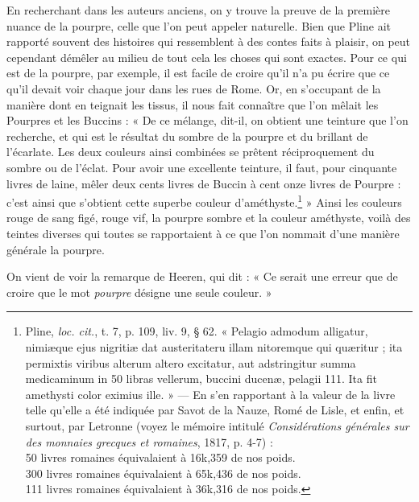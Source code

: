 \documentclass[a4paper, 11pt, oneside, polutonikogreek, french]{article}
\begin{document}
En recherchant dans les auteurs anciens, on y trouve la preuve de la première nuance de la pourpre, celle que l'on peut appeler naturelle. Bien que Pline ait rapporté souvent des histoires qui ressemblent à des contes faits à plaisir, on peut cependant démêler au milieu de tout cela les choses qui sont exactes. Pour ce qui est de la pourpre, par exemple, il est facile de croire qu'il n'a pu écrire que ce qu'il devait voir chaque jour dans les rues de Rome. Or, en s'occupant de la manière dont en teignait les tissus, il nous fait connaître que l'on mêlait les Pourpres et les Buccins : « De ce mélange, dit-il, on obtient une teinture que l'on recherche, et qui est le résultat du sombre de la pourpre et du brillant de l'écarlate. Les deux couleurs ainsi combinées se prêtent réciproquement du sombre ou de l'éclat. Pour avoir une excellente teinture, il faut, pour cinquante livres de laine, mêler deux cents livres de Buccin à cent onze livres de Pourpre : c'est ainsi que s'obtient cette superbe couleur d'améthyste.\footnote{Pline, \emph{loc. cit.}, t. 7, p. 109, liv. 9, § 62. « Pelagio admodum alligatur, nimiæque ejus nigritiæ dat austeritateru illam nitoremque qui quæritur ; ita permixtis viribus alterum altero excitatur, aut adstringitur summa medicaminum in 50 libras vellerum, buccini ducenæ, pelagii 111. Ita fit amethysti color eximius ille. » --- En s'en rapportant à la valeur de la livre telle qu'elle a été indiquée par Savot de la Nauze, Romé de Lisle, et enfin, et surtout, par Letronne (voyez le mémoire intitulé \emph{Considérations générales sur des monnaies grecques et romaines}, 1817, p. 4-7) :\\\hspace*{5mm}50 livres romaines équivalaient à 16k,359 de nos poids.\\\hspace*{5mm}300 livres romaines équivalaient à 65k,436 de nos poids.\\\hspace*{5mm}111 livres romaines équivalaient à 36k,316 de nos poids.} » Ainsi les couleurs rouge de sang figé, rouge vif, la pourpre sombre et la couleur améthyste, voilà des teintes diverses qui toutes se rapportaient à ce que l'on nommait d'une manière générale la pourpre.

On vient de voir la remarque de Heeren, qui dit : « Ce serait une erreur que de croire que le mot \emph{pourpre} désigne une seule couleur. »
\end{document}
